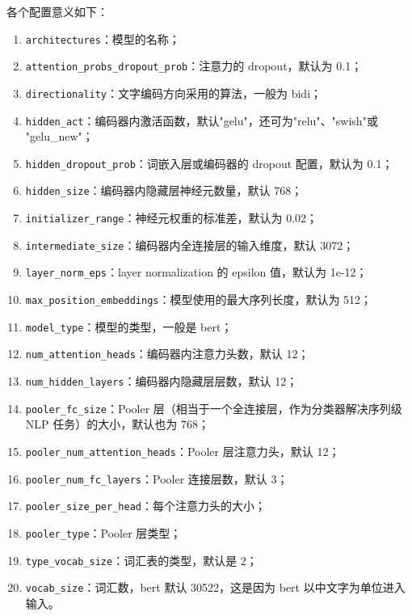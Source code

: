 各个配置意义如下：
\begin{enumerate}
\item \verb`architectures`：模型的名称；
\item \verb`attention_probs_dropout_prob`：注意力的 dropout，默认为 0.1；
\item \verb`directionality`：文字编码方向采用的算法，一般为 bidi；
\item \verb`hidden_act`：编码器内激活函数，默认"gelu"，还可为"relu"、"swish"或 "gelu_new"；
\item \verb`hidden_dropout_prob`：词嵌入层或编码器的 dropout 配置，默认为 0.1；
\item \verb`hidden_size`：编码器内隐藏层神经元数量，默认 768；
\item \verb`initializer_range`：神经元权重的标准差，默认为 0.02；
\item \verb`intermediate_size`：编码器内全连接层的输入维度，默认 3072；
\item \verb`layer_norm_eps`：layer normalization 的 epsilon 值，默认为 1e-12；
\item \verb`max_position_embeddings`：模型使用的最大序列长度，默认为 512；
\item \verb`model_type`：模型的类型，一般是 bert；
\item \verb`num_attention_heads`：编码器内注意力头数，默认 12；
\item \verb`num_hidden_layers`：编码器内隐藏层层数，默认 12；
\item \verb`pooler_fc_size`：Pooler 层（相当于一个全连接层，作为分类器解决序列级 NLP 任务）的大小，默认也为 768；
\item \verb`pooler_num_attention_heads`：Pooler 层注意力头，默认 12；
\item \verb`pooler_num_fc_layers`：Pooler 连接层数，默认 3；
\item \verb`pooler_size_per_head`：每个注意力头的大小；
\item \verb`pooler_type`：Pooler 层类型；
\item \verb`type_vocab_size`：词汇表的类型，默认是 2；
\item \verb`vocab_size`：词汇数，bert 默认 30522，这是因为 bert 以中文字为单位进入输入。
\end{enumerate}